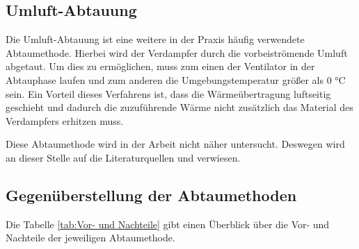 \subsection*{Umluft-Abtauung}

Die Umluft-Abtauung ist eine weitere in der Praxis häufig verwendete Abtaumethode. Hierbei wird der Verdampfer durch die vorbeiströmende Umluft abgetaut. Um dies zu ermöglichen, muss zum einen der Ventilator in der Abtauphase laufen und zum anderen die Umgebungstemperatur größer als 0 °C sein. Ein Vorteil dieses Verfahrens ist, dass die Wärmeübertragung luftseitig geschieht und dadurch die zuzuführende Wärme nicht zusätzlich das Material des Verdampfers erhitzen muss. 

Diese Abtaumethode wird in der Arbeit nicht näher untersucht. Deswegen wird an dieser Stelle auf die  Literaturquellen \citep{Breidenbach2014} und \citep{Ehrbar2002} verwiesen. 

\subsection*{Gegenüberstellung der Abtaumethoden}
\label{subsec:Gegenüberstellung }

Die Tabelle \ref{tab:Vor- und Nachteile} gibt einen Überblick über die Vor- und Nachteile der jeweiligen Abtaumethode. 

